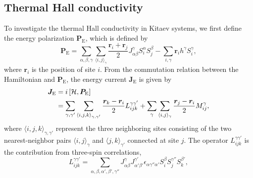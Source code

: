 \documentclass[twocolumn,superscriptaddress,showpacs, longbibliography, aps, prb]{revtex4-2}
\newcommand{\red}[1]{\textcolor{red}{#1}}
\newcommand{\blue}[1]{\textcolor{blue}{#1}}
\newcommand{\orange}[1]{\textcolor{orange}{#1}}
\begin{document}
\subsection{Thermal Hall conductivity}
To investigate the thermal Hall conductivity in %
Kitaev systems, we first define 
the energy polarization $\bm{P}_{\mathrm{E}}$, which %
is defined %
by~\cite{Katsura2010,NasuYM2017}
\begin{equation}
 \bm{P}_{\mathrm{E}} = \sum_{\alpha,\beta,\gamma}\sum_{\langle i,j\rangle_\gamma} \frac{\bm{r}_i + \bm{r}_j}{2} J_{\alpha\beta}^\gamma S_i^\alpha S_j^\beta - \sum_{i,\gamma} \bm{r}_i h^\gamma S_i^\gamma,
\end{equation}
where $\bm{r}_i$ is the position of site $i$. 
From the commutation relation between the Hamiltonian and $\bm{P}_{\mathrm{E}}$,
the energy current $\bm{J}_{\mathrm{E}}$ is 
given by
  \begin{align}
   \bm{J}_{\mathrm{E}} &=  i \left[\mathcal{H}, \bm{P}_{\mathrm{E}}\right] \notag \\
&= \sum_{\gamma,\gamma'}\sum_{\langle i,j,k\rangle_{\gamma,\gamma'}} \frac{\bm{r}_k-\bm{r}_i}{2}L_{ijk}^{\gamma\gamma'} + \sum_{\gamma}\sum_{\langle i,j\rangle_{\gamma}} \frac{\bm{r}_j-\bm{r}_i}{2}M_{ij}^{\gamma} 
   \label{eq:def_J},
  \end{align}
where $\langle i,j,k\rangle_{\gamma,\gamma'}$ represent the three neighboring sites consisting of the two nearest-neighbor pairs $\langle i,j\rangle_{\gamma}$ and $\langle j,k\rangle_{\gamma'}$ connected at site $j$.
The operator $L_{ijk}^{\gamma\gamma'}$ is the contribution from three-spin correlations,
\begin{equation}
 L_{ijk}^{\gamma\gamma'} = \sum_{\alpha,\beta,\alpha',\beta',\gamma''} J_{\alpha\beta}^\gamma J_{\alpha'\beta'}^{\gamma'} \epsilon_{\alpha\gamma''\alpha'} S_i^\beta S_j^{\gamma''}S_k^{\beta'},
 \label{eq:L}
\end{equation}
\end{document}
